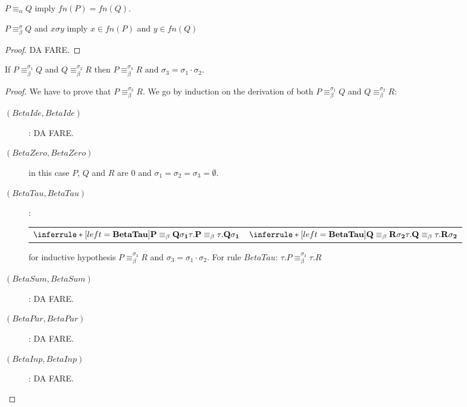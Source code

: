 \begin{corollary}
  $P\equiv_{\alpha}Q$ imply $fn(P)=fn(Q)$.
\end{corollary}


\begin{lemma}\label{freeNamesAndBetaEquivalence2}
  $P\equiv_{\beta}^{\sigma}Q$ and $x\sigma y$ imply $x\in fn(P)$ and $y\in fn(Q)$
  \begin{proof}
    DA FARE.
  \end{proof}
\end{lemma}



\begin{lemma}\label{alphaEquivalenceIsTransitive}
  If $P\equiv_{\beta}^{\sigma_{1}} Q$ and $Q\equiv_{\beta}^{\sigma_{2}} R$ then $P \equiv_{\beta}^{\sigma_{3}} R$ and $\sigma_{3}= \sigma_{1} \cdot \sigma_{2}$.
  \begin{proof}
    We have to prove that $P\equiv_{\beta}^{\sigma_{3}} R$. We go by induction on the derivation of both $P\equiv_{\beta}^{\sigma_{1}} Q$ and $Q\equiv_{\beta}^{\sigma_{2}} R$:
    \begin{description}
      \item[$(BetaIde, BetaIde)$]: DA FARE.
      \item[$(BetaZero, BetaZero)$]
	in this case $P$, $Q$ and $R$ are $0$ and $\sigma_{1}=\sigma_{2}=\sigma_{3}=\emptyset$.
      \item[$(BetaTau, BetaTau)$]:
	\begin{center}
	  \begin{tabular}{ll}
	      $\inferrule*[left=\bf{BetaTau}]{
		  P \equiv_{\beta} Q
		\\
		   \sigma_{1}
	      }{
		  \tau.P \equiv_{\beta} \tau.Q
		\\
		  \sigma_{1}
	      }$	      
	    &
	      $\inferrule*[left=\bf{BetaTau}]{
		  Q \equiv_{\beta} R
		\\
		  \sigma_{2}
	      }{
		  \tau.Q \equiv_{\beta} \tau.R
		\\
		  \sigma_{2}
	      }$
	  \end{tabular}
	\end{center}
	for inductive hypothesis $P\equiv_{\beta}^{\sigma_{3}} R$ and $\sigma_{3}=\sigma_{1}\cdot \sigma_{2}$. For rule $BetaTau$: $\tau.P\equiv_{\beta}^{\sigma_{3}} \tau.R$
      \item[$(BetaSum, BetaSum)$]: DA FARE.
      \item[$(BetaPar, BetaPar)$]: DA FARE.
      \item[$(BetaInp, BetaInp)$]: DA FARE.

\end{description}
\end{proof}
\end{lemma}

